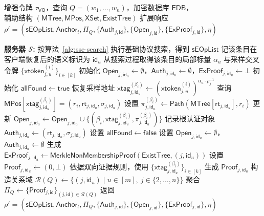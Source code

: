 \begin{breakablealgorithm}
\caption{扩展搜索证明流程 $\mathsf{Search\text{-}Prove}'$}
\label{alg:commit-search}
\begin{algorithmic}[1]
\REQUIRE 增强令牌 $\tau_{\mathsf{VQ}}$，查询 $Q=(w_1,\ldots,w_n)$，加密数据库 $\mathsf{EDB}$，\\辅助结构 $(\mathsf{MTree},\mathsf{MPos},\mathsf{XSet},\mathsf{ExistTree})$
\ENSURE 扩展响应 $\rho'=(\mathsf{sEOpList},\mathsf{Anchor}_t,\Pi_Q,\{\mathsf{Auth}_{j,\mathsf{id}}\},\{\mathsf{Open}_{j,\mathsf{id}}\},\{\mathsf{ExProof}_{j,\mathsf{id}}\},\eta)$
\item[] \textbf{服务器 $\mathcal{S}$:}
\STATE 按算法~\ref{alg:sse-search} 执行基础协议搜索，得到 $\mathsf{sEOpList}$
  \STATE 记该条目在客户端恢复后的语义标识为 $\mathsf{id}_u$
    \STATE 从搜索过程取得该条目的局部标量 $\alpha_u$ 与采样交叉令牌 $\{\mathsf{xtoken}_{j,u}^{(i)}\}_{i\in[k]}$
    \STATE 初始化 $\mathsf{Open}_{j,\mathsf{id}_u}\leftarrow \emptyset$，$\mathsf{Auth}_{j,\mathsf{id}_u}\leftarrow \emptyset$，$\mathsf{ExProof}_{j,\mathsf{id}_u}\leftarrow\bot$
    \STATE 初始化 $\mathsf{allFound}\leftarrow\mathsf{true}$
      \STATE 恢复采样地址 $\mathsf{xtag}_{j,\mathsf{id}_u}^{(\beta_i)}\leftarrow (\mathsf{xtoken}_{j,u}^{(i)})^{\alpha_u\cdot\rho_j^{-1}}$
        \STATE 查询 $\mathsf{MPos}[\mathsf{xtag}_{j,\mathsf{id}_u}^{(\beta_i)}]=(r_i,\mathsf{rt}_{j,\mathsf{id}_u},\sigma_{j,\mathsf{id}_u})$
        \STATE 设置 $\pi_{j,\mathsf{id}_u}^{(\beta_i)}\leftarrow \mathsf{Path}(\mathsf{MTree}[\mathsf{rt}_{j,\mathsf{id}_u}],r_i)$
        \STATE 更新 $\mathsf{Open}_{j,\mathsf{id}_u}\leftarrow \mathsf{Open}_{j,\mathsf{id}_u}\cup\{(\beta_i,\mathsf{xtag}_{j,\mathsf{id}_u}^{(\beta_i)},\pi_{j,\mathsf{id}_u}^{(\beta_i)})\}$
        \STATE 记录根认证对象 $\mathsf{Auth}_{j,\mathsf{id}_u}\leftarrow (\mathsf{rt}_{j,\mathsf{id}_u},\sigma_{j,\mathsf{id}_u})$
      \ELSE
        \STATE 设置 $\mathsf{allFound}\leftarrow\mathsf{false}$
      \ENDIF
    \ENDFOR
      \STATE 设置 $\mathsf{Open}_{j,\mathsf{id}_u}\leftarrow\emptyset$，$\mathsf{Auth}_{j,\mathsf{id}_u}\leftarrow\emptyset$
      \STATE 生成 $\mathsf{ExProof}_{j,\mathsf{id}_u}\leftarrow\mathsf{MerkleNonMembershipProof}(\mathsf{ExistTree},(j,\mathsf{id}_u))$
      \STATE 设置 $\mathsf{Proof}_{j,\mathsf{id}_u}\leftarrow(0,\bot)$
    \ELSE
      \STATE 依据双向证据规则，使用 $\{\mathsf{xtag}_{j,\mathsf{id}_u}^{(\beta_i)}\}_{i\in[k]}$ 生成 $\mathsf{Proof}_{j,\mathsf{id}_u}$
    \ENDIF
  \ENDFOR
\ENDFOR
\STATE 构造关系域 $\mathcal{R}(Q)\leftarrow\{(j,\mathsf{id}_u)\mid u\in[m],\ j\in\{2,\ldots,n\}\}$
\STATE 聚合 $\Pi_Q\leftarrow\{\mathsf{Proof}_{j,\mathsf{id}}\}_{(j,\mathsf{id})\in\mathcal{R}(Q)}$
\STATE 返回 $\rho'=(\mathsf{sEOpList},\mathsf{Anchor}_t,\Pi_Q,\{\mathsf{Auth}_{j,\mathsf{id}}\},\{\mathsf{Open}_{j,\mathsf{id}}\},\{\mathsf{ExProof}_{j,\mathsf{id}}\},\eta)$
\end{algorithmic}
\end{breakablealgorithm}

